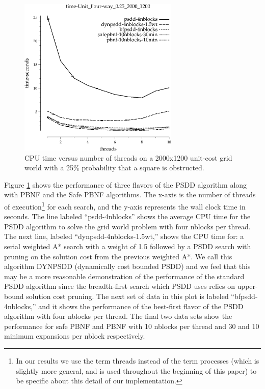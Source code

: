\documentclass{article}
\begin{document}
\begin{figure}[t]
\includegraphics[width=3in]{../graphs/grid_unit_four-way_0.25_2000_1200/time-Unit_Four-way_0.25_2000_1200.eps}
\caption{CPU time versus number of threads on a 2000x1200 unit-cost
  grid world with a 25\% probability that a square is obstructed.}
\label{fig:grid-unit}
\end{figure}

Figure \ref{fig:grid-unit} shows the performance of three flavors of
the PSDD algorithm along with PBNF and the Safe PBNF algorithms.  The
x-axis is the number of threads of execution\footnote{In our results
  we use the term threads instead of the term processes (which is
  slightly more general, and is used throughout the beginning of this
  paper) to be specific about this detail of our implementation.} for
each search, and the y-axis represents the wall clock time in
seconds. The line labeled ``psdd-4nblocks'' shows the average CPU time
for the PSDD algorithm to solve the grid world problem with four
nblocks per thread.  The next line, labeled
``dynpsdd-4nblocks-1.5wt,'' shows the CPU time for: a serial weighted
A* search with a weight of 1.5 followed by a PSDD search with pruning
on the solution cost from the previous weighted A*.  We call this
algorithm DYNPSDD (dynamically cost bounded PSDD) and we feel that
this may be a more reasonable demonstration of the performance of the
standard PSDD algorithm since the breadth-first search which PSDD uses
relies on upper-bound solution cost pruning.  The next set of data in
this plot is labeled ``bfpsdd-4nblocks,'' and it shows the performance
of the best-first flavor of the PSDD algorithm with four nblocks per
thread.  The final two data sets show the performance for safe PBNF
and PBNF with 10 nblocks per thread and 30 and 10 minimum expansions
per nblock respectively.
\end{document}
